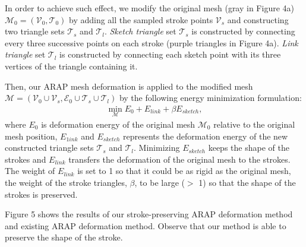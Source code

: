 In order to achieve such effect, we modify the original mesh (gray in Figure 4a) $ \mathcal{M}_0 = (\mathcal{V}_0, \mathcal{T}_0) $ by adding all the sampled stroke points $ \mathcal{V}_s $ and constructing two triangle sets $ \mathcal{T}_s $ and $ \mathcal{T}_l $.
\textit{Sketch triangle} set $\mathcal{T}_s $ is constructed by connecting every three successive points on each stroke (purple triangles in Figure 4a).
\textit{Link triangle} set $\mathcal{T}_l $ is constructed by connecting each sketch point with its three vertices of the triangle containing it.

%	

Then, our ARAP mesh deformation is applied to the modified mesh $ \mathcal{M} = (\mathcal{V}_0 \cup \mathcal{V}_s, \mathcal{E}_0 \cup \mathcal{T}_s \cup \mathcal{T}_l) $ by the following energy minimization formulation:
\begin{align}
\min_\mathcal{M} E_0 + E_{link} + \beta E_{sketch},
\end{align}
where $ E_0 $ is deformation energy of the original mesh $ \mathcal{M}_0 $ relative to the original mesh position, $ E_{1ink} $ and $ E_{sketch} $ represents the deformation energy of the new constructed triangle sets $\mathcal{T}_s $ and $\mathcal{T}_l $. Minimizing $ E_{sketch} $ keeps the shape of the strokes and  $ E_{link} $ transfers the deformation of the original mesh to the strokes. The weight of $ E_{link} $ is set to 1 so that it could be as rigid as the original mesh, the weight of the stroke triangles, $ \beta $, to be large ($ > $ 1) so that the shape of the strokes is preserved. 

Figure 5 shows the results of our stroke-preserving ARAP deformation method and existing ARAP deformation method. Observe that our method is able to preserve the shape of the stroke.


